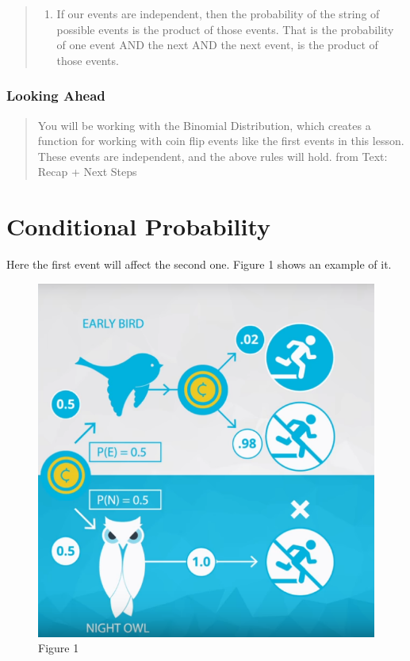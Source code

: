 \documentclass[]{book}
\providecommand{\tightlist}{%
  \setlength{\itemsep}{0pt}\setlength{\parskip}{0pt}}
\begin{document}
\begin{quote}
\begin{enumerate}
\def\labelenumi{\arabic{enumi}.}
\setcounter{enumi}{2}
\tightlist
\item
  If our events are independent, then the probability of the string of
  possible events is the product of those events. That is the
  probability of one event AND the next AND the next event, is the
  product of those events.
\end{enumerate}
\end{quote}

\subsubsection{Looking Ahead}\label{looking-ahead}

\begin{quote}
You will be working with the Binomial Distribution, which creates a
function for working with coin flip events like the first events in this
lesson. These events are independent, and the above rules will hold.
from Text: Recap + Next Steps
\end{quote}

\section{Conditional Probability}\label{conditional-probability}

Here the first event will affect the second one. Figure 1 shows an
example of it.

\begin{figure}
\centering
\includegraphics{01-img/c4_l6_01.png}
\caption{Figure 1}
\end{figure}
\end{document}
